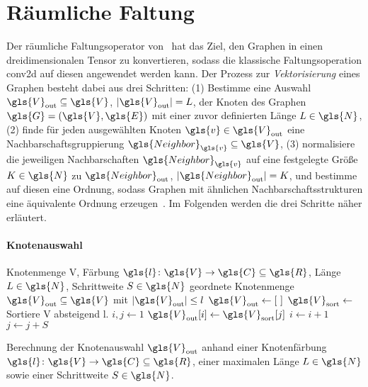 \section{Räumliche Faltung}
\label{raeumliche_faltung}

Der räumliche Faltungsoperator von~\citeauthor{patchy} hat das Ziel, den Graphen in einen dreidimensionalen Tensor zu konvertieren, sodass die klassische Faltungsoperation \gls{conv2d} auf diesen angewendet werden kann.
Der Prozess zur \emph{Vektorisierung} eines Graphen besteht dabei aus drei Schritten: (1) Bestimme eine Auswahl $\gls{V}_{\mathrm{out}} \subseteq \gls{V}$, $\left|\gls{V}_{\mathrm{out}}\right| = L$, der Knoten des Graphen $\gls{G} = \left(\gls{V}, \gls{E}\right)$ mit einer zuvor definierten Länge $L \in \gls{N}$, (2) finde für jeden ausgewählten Knoten $\gls{v} \in \gls{V}_{\mathrm{out}}$ eine Nachbarschaftsgruppierung $\gls{Neighbor}_{\gls{v}} \subseteq \gls{V}$, (3) normalisiere die jeweiligen Nachbarschaften $\gls{Neighbor}_{\gls{v}}$ auf eine festgelegte Größe $K \in \gls{N}$ zu $\gls{Neighbor}_{\mathrm{out}}$, $\left|\gls{Neighbor}_{\mathrm{out}}\right| = K$, und bestimme auf diesen eine Ordnung, sodass Graphen mit ähnlichen Nachbarschaftsstrukturen eine äquivalente Ordnung erzeugen~\cite{patchy}.
Im Folgenden werden die drei Schritte näher erläutert.

\paragraph{Knotenauswahl}
\label{knotenauswahl}

\begin{algorithm}[t]
\centering
\begin{algorithmic}
  \REQUIRE{} Knotenmenge \gls{V}, Färbung $\gls{l} \colon \gls{V} \to \gls{C} \subseteq \gls{R}$, Länge $L \in \gls{N}$, Schrittweite $S \in \gls{N}$
  \ENSURE{} geordnete Knotenmenge $\gls{V}_{\mathrm{out}} \subseteq \gls{V}$ mit $\left|\gls{V}_{\mathrm{out}}\right| \leq l$
  \STATE{} $\gls{V}_\mathrm{out} \leftarrow \left[\,\,\right]$
  \STATE{} $\gls{V}_{\mathrm{sort}} \leftarrow$ Sortiere \gls{V} absteigend \bzgl{} \gls{l}.
  \STATE{} $i, j \leftarrow 1$
      \STATE{} $\gls{V}_{\mathrm{out}}\left[i\right] \leftarrow \gls{V}_{\mathrm{sort}}\left[j\right]$
    \ENDIF{}
    \STATE{} $i \leftarrow i + 1$
    \STATE{} $j \leftarrow j + S$
  \ENDWHILE{}
\end{algorithmic}
\caption[Knotenauswahl]{Berechnung der Knotenauswahl $\gls{V}_{\mathrm{out}}$ anhand einer Knotenfärbung $\gls{l} \colon \gls{V} \to \gls{C} \subseteq \gls{R}$, einer maximalen Länge $L\in\gls{N}$ sowie einer Schrittweite $S \in \gls{N}$.}
\label{alg:knotenauswahl}
\end{algorithm}

